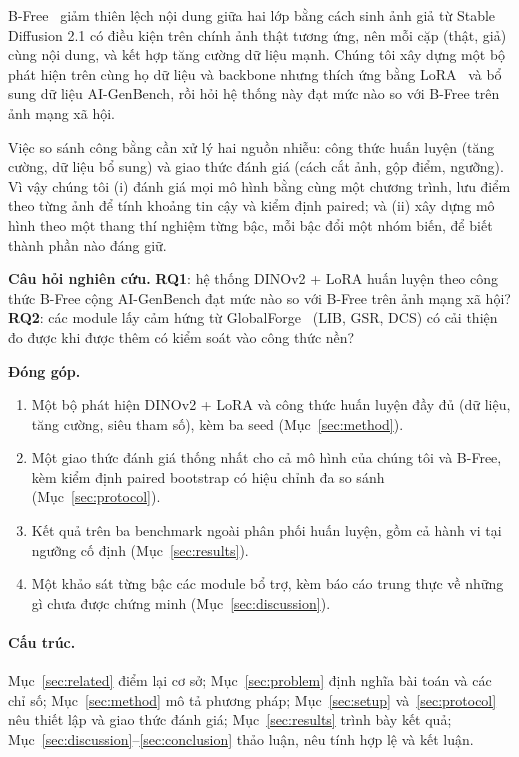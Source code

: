 \documentclass[11pt,a4paper]{article}
\begin{document}
B-Free~\cite{guillaro2025bfree} giảm thiên lệch nội dung giữa hai lớp bằng cách sinh ảnh giả từ Stable Diffusion 2.1 có điều kiện trên chính ảnh thật tương ứng, nên mỗi cặp (thật, giả) cùng nội dung, và kết hợp tăng cường dữ liệu mạnh. Chúng tôi xây dựng một bộ phát hiện trên cùng họ dữ liệu và backbone nhưng thích ứng bằng LoRA~\cite{hu2022lora} và bổ sung dữ liệu AI-GenBench, rồi hỏi hệ thống này đạt mức nào so với B-Free trên ảnh mạng xã hội.

Việc so sánh công bằng cần xử lý hai nguồn nhiễu: công thức huấn luyện (tăng cường, dữ liệu bổ sung) và giao thức đánh giá (cách cắt ảnh, gộp điểm, ngưỡng). Vì vậy chúng tôi (i) đánh giá mọi mô hình bằng cùng một chương trình, lưu điểm theo từng ảnh để tính khoảng tin cậy và kiểm định paired; và (ii) xây dựng mô hình theo một thang thí nghiệm từng bậc, mỗi bậc đổi một nhóm biến, để biết thành phần nào đáng giữ.

\textbf{Câu hỏi nghiên cứu.} \textbf{RQ1}: hệ thống DINOv2 + LoRA huấn luyện theo công thức B-Free cộng AI-GenBench đạt mức nào so với B-Free trên ảnh mạng xã hội? \textbf{RQ2}: các module lấy cảm hứng từ GlobalForge~\cite{cui2026globalforge} (LIB, GSR, DCS) có cải thiện đo được khi được thêm có kiểm soát vào công thức nền?

\textbf{Đóng góp.}
\begin{enumerate}
  \item Một bộ phát hiện DINOv2 + LoRA và công thức huấn luyện đầy đủ (dữ liệu, tăng cường, siêu tham số), kèm ba seed (Mục~\ref{sec:method}).
  \item Một giao thức đánh giá thống nhất cho cả mô hình của chúng tôi và B-Free, kèm kiểm định paired bootstrap có hiệu chỉnh đa so sánh (Mục~\ref{sec:protocol}).
  \item Kết quả trên ba benchmark ngoài phân phối huấn luyện, gồm cả hành vi tại ngưỡng cố định (Mục~\ref{sec:results}).
  \item Một khảo sát từng bậc các module bổ trợ, kèm báo cáo trung thực về những gì chưa được chứng minh (Mục~\ref{sec:discussion}).
\end{enumerate}
\paragraph{Cấu trúc.} Mục~\ref{sec:related} điểm lại cơ sở; Mục~\ref{sec:problem} định nghĩa bài toán và các chỉ số; Mục~\ref{sec:method} mô tả phương pháp; Mục~\ref{sec:setup} và~\ref{sec:protocol} nêu thiết lập và giao thức đánh giá; Mục~\ref{sec:results} trình bày kết quả; Mục~\ref{sec:discussion}--\ref{sec:conclusion} thảo luận, nêu tính hợp lệ và kết luận.
\end{document}
